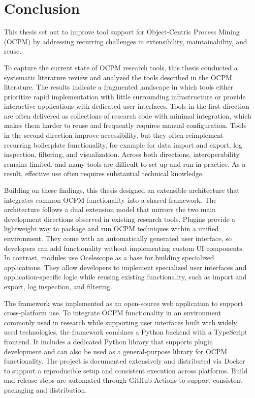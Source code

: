 \chapter{Conclusion}
\label{chap:conclusion}

This thesis set out to improve tool support for Object-Centric Process Mining (OCPM) by addressing recurring challenges in extensibility, maintainability, and reuse.

To capture the current state of OCPM research tools, this thesis conducted a systematic literature review and analyzed the tools described in the OCPM literature.
The results indicate a fragmented landscape in which tools either prioritize rapid implementation with little surrounding infrastructure or provide interactive applications with dedicated user interfaces.
Tools in the first direction are often delivered as collections of research code with minimal integration, which makes them harder to reuse and frequently requires manual configuration.
Tools in the second direction improve accessibility, but they often reimplement recurring boilerplate functionality, for example for data import and export, log inspection, filtering, and visualization.
Across both directions, interoperability remains limited, and many tools are difficult to set up and run in practice.
As a result, effective use often requires substantial technical knowledge.

Building on these findings, this thesis designed an extensible architecture that integrates common OCPM functionality into a shared framework.
The architecture follows a dual extension model that mirrors the two main development directions observed in existing research tools.
Plugins provide a lightweight way to package and run OCPM techniques within a unified environment.
They come with an automatically generated user interface, so developers can add functionality without implementing custom UI components.
In contrast, modules use Ocelescope as a base for building specialized applications.
They allow developers to implement specialized user interfaces and application-specific logic while reusing existing functionality, such as import and export, log inspection, and filtering.

The framework was implemented as an open-source web application to support cross-platform use.
To integrate OCPM functionality in an environment commonly used in research while supporting user interfaces built with widely used technologies, the framework combines a Python backend with a TypeScript frontend.
It includes a dedicated Python library that supports plugin development and can also be used as a general-purpose library for OCPM functionality.
The project is documented extensively and distributed via Docker to support a reproducible setup and consistent execution across platforms.
Build and release steps are automated through GitHub Actions to support consistent packaging and distribution.


